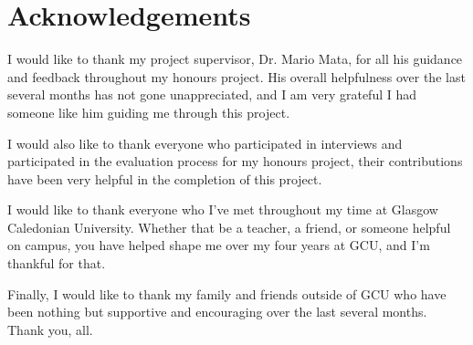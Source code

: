 \documentclass[12pt]{article}
\begin{document}
\newpage

\section*{Acknowledgements}
I would like to thank my project supervisor, Dr. Mario Mata, for all his guidance and feedback throughout my honours project. His overall helpfulness over the last several months
has not gone unappreciated, and I am very grateful I had someone like him guiding me through this project. \newline

I would also like to thank everyone who participated in interviews and participated in the evaluation process for my honours project, their contributions have been very helpful in
the completion of this project. \newline

I would like to thank everyone who I've met throughout my time at Glasgow Caledonian University. Whether that be a teacher, a friend, or someone helpful on campus, you have helped shape
me over my four years at GCU, and I'm thankful for that. \newline

Finally, I would like to thank my family and friends outside of GCU who have been nothing but supportive and encouraging over the last several months. Thank you, all.

\newpage
\tableofcontents
\listoffigures
\listoftables
\lstlistoflistings
\newpage
\end{document}
